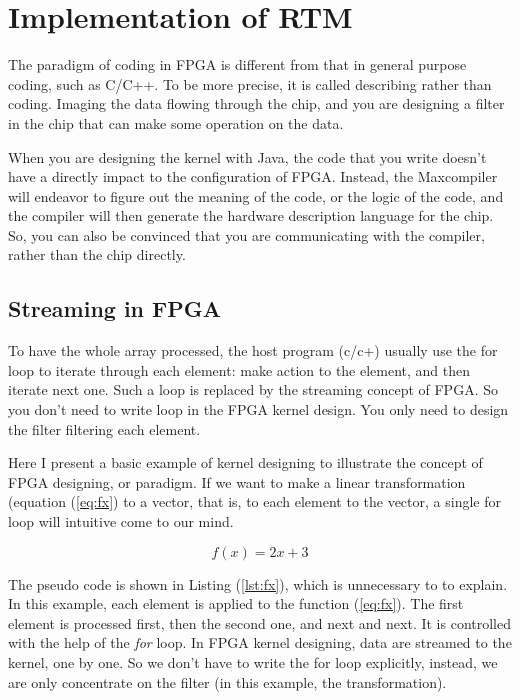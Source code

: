 \chapter{Implementation of RTM} %

\label{sec:Implementation of FPGA}

The paradigm of coding in FPGA is different from that in general purpose
coding, such as C/C++. To be more precise, it is called describing rather
than coding. Imaging the data flowing through the chip, and you are
designing a filter in the chip that can make some operation on the data.

When you are designing the kernel with Java, the code that you write
doesn't have a directly impact to the configuration of FPGA. Instead, the
Maxcompiler will endeavor to figure out the meaning of the code, or the
logic of the code, and the compiler will then generate the hardware
description language for the chip. So, you can also be convinced that you
are communicating with the compiler, rather than the chip directly.

\section{Streaming in FPGA} %
\label{sub:Streaming in FPGA}

To have the whole array processed, the host program (c/c+) usually use the
for loop to iterate through each element: make action to the element, and
then iterate next one. Such a loop is replaced by the streaming concept of
FPGA. So you don't need to write loop in the FPGA kernel design. You only
need to design the filter filtering each element.

Here I present a basic example of kernel designing to illustrate the
concept of FPGA designing, or paradigm. If we want to make a linear
transformation (equation (\ref{eq:fx})
to a vector, that is, to each element to the vector, a single for loop will
intuitive come to our mind.

\begin{equation}
  f(x) = 2x + 3
  \label{eq:fx}
\end{equation}

The pseudo code is shown in Listing (\ref{lst:fx}), which is unnecessary to
to explain. In this example, each element is applied to the function
(\ref{eq:fx}). The first element is processed first, then the second one,
and next and next. It is controlled with the help of the \emph{for} loop.
In FPGA kernel designing, data are streamed to the kernel, one by one. So
we don't have to write the for loop explicitly, instead, we are only
concentrate on the filter (in this example, the transformation).

